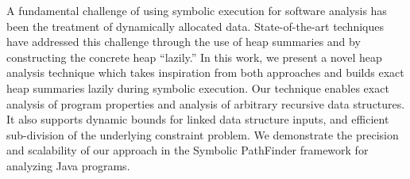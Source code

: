 A fundamental challenge of using symbolic execution for software
analysis has been the treatment of dynamically allocated data.
State-of-the-art techniques have addressed this challenge
through the use of heap summaries and by constructing the concrete
heap ``lazily.'' In this work, we present a novel heap analysis technique
which takes inspiration from both approaches and builds exact heap summaries
lazily during symbolic execution. Our technique enables
exact analysis of program properties and
analysis of arbitrary recursive data structures. It also supports
dynamic bounds for linked data structure inputs, and
efficient sub-division of the underlying constraint problem.
We demonstrate the precision and scalability of our approach
in the Symbolic PathFinder framework for analyzing Java programs.


